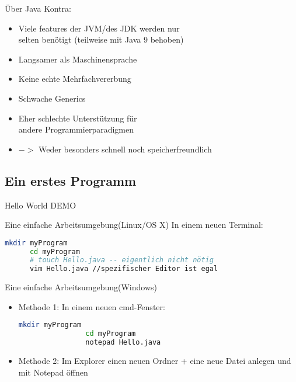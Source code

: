 \begin{frame}{Über Java}
	Kontra:
	\begin{itemize}
        \item Viele features der JVM/des JDK werden nur \\ selten benötigt (teilweise mit Java 9 behoben\footnotemark[1])
		\item Langsamer als Maschinensprache
		\item Keine echte Mehrfachvererbung
		\item Schwache Generics
		\item Eher schlechte Unterstützung für \\ andere Programmierparadigmen
		\item[] $->$ Weder besonders schnell noch speicherfreundlich
	\end{itemize}
\end{frame}

\subsection{Ein erstes Programm}
\begin{frame}{Hello World}
  DEMO
\end{frame}

\begin{frame}[fragile]{Eine einfache Arbeitsumgebung(Linux/OS X)}
  In einem neuen Terminal:
    \begin{lstlisting}[language=bash]
      mkdir myProgram
      cd myProgram
      # touch Hello.java -- eigentlich nicht nötig
      vim Hello.java //spezifischer Editor ist egal\end{lstlisting}
\end{frame}

\begin{frame}[fragile]{Eine einfache Arbeitsumgebung(Windows)}
    \begin{itemize}[<+->]
        \item Methode 1: In einem neuen cmd-Fenster: \\
            \begin{lstlisting}[language=bash]
                mkdir myProgram
                cd myProgram
                notepad Hello.java\end{lstlisting}
        \item Methode 2: Im Explorer einen neuen Ordner + eine neue Datei anlegen und mit Notepad öffnen
    \end{itemize}
\end{frame}
